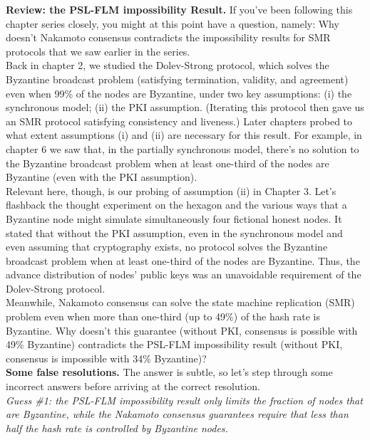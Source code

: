 \noindent
\textbf{Review: the PSL-FLM impossibility Result.} If you’ve been following this chapter
series closely, you might at this point have a question, namely: Why doesn't
Nakamoto consensus contradicts the impossibility results for SMR protocols that we saw
earlier in the series.\\
Back in chapter 2, we studied the Dolev-Strong protocol, which solves the Byzantine
broadcast problem (satisfying termination, validity, and agreement) even when 99\% of the
nodes are Byzantine, under two key assumptions: (i) the synchronous model; (ii) the PKI
assumption. (Iterating this protocol then gave us an SMR protocol satisfying consistency and
liveness.) Later chapters probed to what extent assumptions (i) and (ii) are necessary for this
result. For example, in chapter 6 we saw that, in the partially synchronous model, there’s
no solution to the Byzantine broadcast problem when at least one-third of the nodes are
Byzantine (even with the PKI assumption).\\
Relevant here, though, is our probing of assumption (ii) in Chapter 3. Let's flashback the thought experiment on the hexagon and the various ways
that a Byzantine node might simulate simultaneously four fictional honest nodes. It stated
that without the PKI assumption, even in the synchronous model and even assuming that
cryptography exists, no protocol solves the Byzantine broadcast problem when
at least one-third of the nodes are Byzantine. Thus, the advance distribution of nodes’ public
keys was an unavoidable requirement of the Dolev-Strong protocol.\\
Meanwhile, Nakamoto consensus can solve the state machine replication (SMR) problem
even when more than one-third (up to 49\%) of the hash rate is Byzantine. Why doesn't this
guarantee (without PKI, consensus is possible with 49\% Byzantine) contradicts the PSL-FLM
impossibility result (without PKI, consensus is impossible with 34\% Byzantine)?\\

\noindent
\textbf{Some false resolutions.} The answer is subtle, so let’s step through some incorrect answers
before arriving at the correct resolution.\\

\textit{Guess \#1: the PSL-FLM impossibility result only limits the fraction of nodes that are
Byzantine, while the Nakamoto consensus guarantees require that less than half the
hash rate is controlled by Byzantine nodes.}\\

